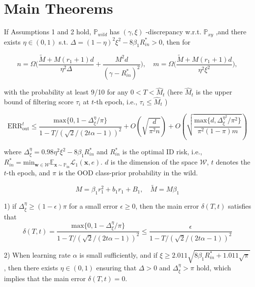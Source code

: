 \section{Main Theorems}
\begin{theorem}
 If Assumptions 1 and 2 hold, $\mathbb{P}_{wild}$ has $(\gamma,\xi)$ -discrepancy w.r.t. $\mathbb{P}_{xy}$ ,and there exists $\eta\in(0,1)$ s.t. $\Delta = ( 1- \eta )^{2}\xi^{2}-8\beta_{1}R_{in}^{*}>0$, then for

$$n=\Omega\big(\frac{\tilde{M}+M(r_1+1)d}{\eta^2\Delta}+\frac{M^2d}{(\gamma-R_{in}^*)^2}\big),\quad m=\Omega\big(\frac{\tilde M+M(r_1+1)d}{\eta^2\xi^2}\big),$$

with the probability at least 9/10 for any $0<T<\widehat{M}_t$ (here $\widehat{M}_t$ is the upper bound of filtering score $\tau_i$ at $t$-th epoch, i.e., $\tau_{i}\leq \widehat{M}_t$ )


\begin{equation}
     \text{ERR}_{\text{out}}^t \leq \frac{\mathrm{max}\{0, 1-\Delta_{\xi}^{\eta}/\pi\}}{1-T/(\sqrt{2}/(2t\alpha - 1))^2}
     + O(\sqrt{\frac{d}{\pi^2 n}}) + O(\sqrt{\frac{\mathrm{max}\{d, \Delta_{\xi}^{\eta^2}/\pi^2\}}{\pi^2(1-\pi)m}})
\end{equation}

where $
\Delta_{\xi}^{\eta} = 0.98\eta^2\xi^2 - 8\beta_1 R_{in}^{*}
$ and  $R_{in}^{*}$ is the optimal ID risk, i.e., $R_{in}^{*} = \mathrm{min}_{\mathbf{w}\in \mathcal{W}}\mathbb{E_{\mathbf{x}\sim\mathbb{P}_{\mathrm{in}}}}\mathcal{L}_1(\mathbf{x}, e)$.
$d$ is  the dimension of the space $\mathcal{W}$, $t$ denotes the $t$-th epoch, and $\pi$ is the OOD class-prior probability in the wild.

\begin{equation}
M=\beta_{1}r_{1}^{2}+b_{1}r_{1}+B_{1},\quad\tilde{M}=M\beta_{1}
\end{equation}
\end{theorem}

\begin{theorem}
1) if $\Delta_{\xi}^{\eta} \geq (1-\epsilon)\pi$ for a small error $\epsilon \geq 0$, then the main error $\delta(T,t)$ satisfies that
    \begin{equation}
        \delta(T, t) = \frac{\mathrm{max}\{0, 1-\Delta_{\xi}^{\eta}/\pi\}}{1-T/(\sqrt{2}/(2t\alpha - 1))^2}
        \leq \frac{\epsilon}{1-T/(\sqrt{2}/(2t\alpha - 1))^2}
    \end{equation}

2) When learning rate $\alpha$ is small sufficiently, and if $\xi \geq 2.011\sqrt{8\beta_1 R_{in}^{*} + 1.011\sqrt{\pi}}$, then there exists $\eta \in (0, 1)$ ensuring that $\Delta > 0$ and $\Delta_{\xi}^{\eta}>\pi$ hold, which implies that the main error $\delta(T, t) = 0$.
    
\end{theorem}

